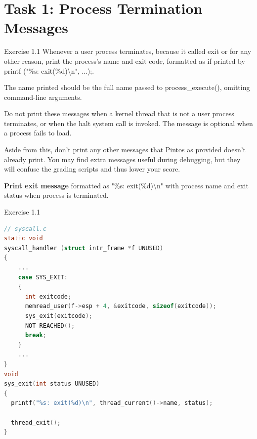 \documentclass[10pt]{beamer}
\begin{document}
\section{Task 1: Process Termination Messages}
\begin{frame}{Exercise 1.1}
    Whenever a user process terminates, because it called exit or for any other reason, print the process's name and exit code, formatted as if printed by printf ("\%s: exit(\%d)\textbackslash n", ...);.

The name printed should be the full name passed to process\_execute(), omitting command-line arguments.

Do not print these messages when a kernel thread that is not a user process terminates, or when the halt system call is invoked. The message is optional when a process fails to load.

Aside from this, don't print any other messages that Pintos as provided doesn't already print. You may find extra messages useful during debugging, but they will confuse the grading scripts and thus lower your score.

\textbf{Print exit message} formatted as "\%s: exit(\%d)\textbackslash n" with process name and exit status when process is terminated.
\end{frame}
\begin{frame}[fragile]{Exercise 1.1}
    \begin{lstlisting}[language=C]
// syscall.c
static void
syscall_handler (struct intr_frame *f UNUSED) 
{
    ...
    case SYS_EXIT:
    {
      int exitcode;
      memread_user(f->esp + 4, &exitcode, sizeof(exitcode));
      sys_exit(exitcode);
      NOT_REACHED();
      break;
    }
    ...
}
void 
sys_exit(int status UNUSED) 
{
  printf("%s: exit(%d)\n", thread_current()->name, status);

  thread_exit();
}
    \end{lstlisting}
\end{frame}
\end{document}
